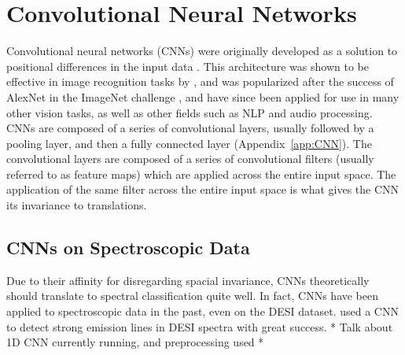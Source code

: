 \section{Convolutional Neural Networks}
\label{sec:CNN}
Convolutional neural networks (CNNs) were originally developed as a solution 
to positional differences in the input data \parencite{fukushima1979}. This architecture 
was shown to be effective in image recognition tasks by \textcite{lecun2004}, and 
was popularized after the success of AlexNet in the 
ImageNet challenge \textcite{krizhevsky2012}, and have since been applied for use in 
many other vision tasks, as well as other fields such as NLP and audio processing. 
CNNs are composed of a series of convolutional layers, usually followed by a 
pooling layer, and then a fully connected layer (Appendix~\ref{app:CNN}). The convolutional layers are 
composed of a series of convolutional filters (usually referred to as feature maps)
which are applied across the entire input space. The application of the same filter 
across the entire input space is what gives the CNN its invariance to translations.

\subsection{CNNs on Spectroscopic Data}
\label{sec:CNNspectra}
Due to their affinity for disregarding spacial invariance, CNNs theoretically should 
translate to spectral classification quite well. In fact, CNNs have been applied 
to spectroscopic data in the past, even on the DESI dataset. 
\textcite{parks2018} used a CNN to detect strong emission lines in DESI spectra with 
great success. * Talk about 1D CNN currently running, and preprocessing used *

